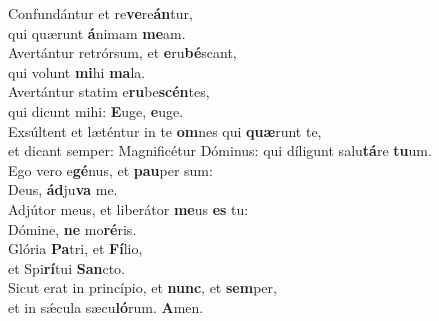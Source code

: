 \evenverse Confundántur et re\textbf{ve}re\textbf{án}tur,~\*\\
\evenverse qui quærunt \textbf{á}nimam \textbf{me}am.\\
\oddverse Avertántur retrórsum, et \textbf{e}ru\textbf{bé}scant,~\*\\
\oddverse qui volunt \textbf{mi}hi \textbf{ma}la.\\
\evenverse Avertántur statim e\textbf{ru}be\textbf{scén}tes,~\*\\
\evenverse qui dicunt mihi: \textbf{E}uge, \textbf{e}uge.\\
\oddverse Exsúltent et læténtur in te \textbf{om}nes qui \textbf{quæ}runt te,~\*\\
\oddverse et dicant semper: Magnificétur Dóminus: qui díligunt salu\textbf{tá}re \textbf{tu}um.\\
\evenverse Ego vero e\textbf{gé}nus, et \textbf{pau}per sum:~\*\\
\evenverse Deus, \textbf{ád}ju\textbf{va} me.\\
\oddverse Adjútor meus, et liberátor \textbf{me}us \textbf{es} tu:~\*\\
\oddverse Dómine, \textbf{ne} mo\textbf{ré}ris.\\
\evenverse Glória \textbf{Pa}tri, et \textbf{Fí}lio,~\*\\
\evenverse et Spi\textbf{rí}tui \textbf{San}cto.\\
\oddverse Sicut erat in princípio, et \textbf{nunc}, et \textbf{sem}per,~\*\\
\oddverse et in sǽcula sæcu\textbf{ló}rum. \textbf{A}men.\\
